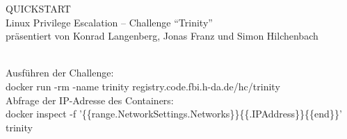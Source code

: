 \documentclass[
    parskip=half
]{scrartcl}
\begin{document}
%
%
\color{matrixgreen}%
\begin{center}
\Huge QUICKSTART\\
\huge Linux Privilege Escalation -- Challenge \enquote{Trinity}\\
\small präsentiert von Konrad Langenberg, Jonas Franz und Simon Hilchenbach
\end{center}
\vspace*{8mm}
\raggedright%
\LARGE\\
\vspace*{12mm}%
Ausführen der Challenge:\\
{\small docker run {-}\kern0mm\relax{-}rm {-}\kern0mm\relax{-}name trinity registry.code.fbi.h-da.de/hc/trinity}\\
\vspace*{4mm}%
Abfrage der IP-Adresse des Containers:\\
{\small docker inspect -f '\{\{range.NetworkSettings.Networks\}\}\{\{.IPAddress\}\}\{\{end\}\}' trinity}\\
\end{document}
